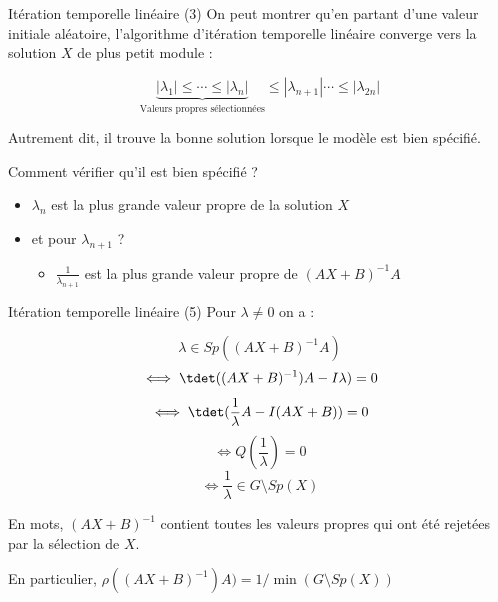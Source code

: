 \documentclass[
  ignorenonframetext,
]{beamer}
\providecommand{\tightlist}{%
  \setlength{\itemsep}{0pt}\setlength{\parskip}{0pt}}
\begin{document}
\begin{frame}{Itération temporelle linéaire (3)}
\label{ituxe9ration-temporelle-linuxe9aire-3}
On peut montrer qu'en partant d'une valeur initiale aléatoire,
l'algorithme d'itération temporelle linéaire converge vers la solution
\(X\) de plus petit module :

\[\underbrace{|\lambda_1| \leq \cdots  \leq |\lambda_n|}_{\text{Valeurs propres sélectionnées}} \leq |\lambda_{n+1}|\cdots \leq |\lambda_{2n}|\]

Autrement dit, il trouve la bonne solution lorsque le modèle est bien
spécifié.

Comment vérifier qu'il est bien spécifié ?

\begin{itemize}
\tightlist
\item
  \(\lambda_n\) est la plus grande valeur propre de la solution \(X\)
\item
  et pour \(\lambda_{n+1}\) ?

  \begin{itemize}
  \tightlist
  \item
    \(\frac{1}{\lambda_{n+1}}\) est la plus grande valeur propre de
    \((AX+B)^{-1}A\)
  \end{itemize}
\end{itemize}
\end{frame}


\begin{frame}{Itération temporelle linéaire (5)}
\label{ituxe9ration-temporelle-linuxe9aire-5}
Pour \(\lambda \neq 0\) on a :

\[\lambda \in Sp((A X +B )^{-1} A)\]
\[\iff\tdet( (A X +B )^{-1})A - I\lambda )=0\]
\[\iff\tdet( \frac{1}{\lambda} A - I (A X +B )  )=0\]
\[\iff Q(\frac{1}{\lambda})=0\]
\[\iff \frac{1}{\lambda} \in G \setminus Sp(X)\]

En mots, \((AX+B)^{-1}\) contient toutes les valeurs propres qui ont été
rejetées par la sélection de \(X\).

En particulier, \(\rho((AX+B)^{-1})A)=1/\min(G\setminus Sp(X))\)
\end{frame}
\end{document}
